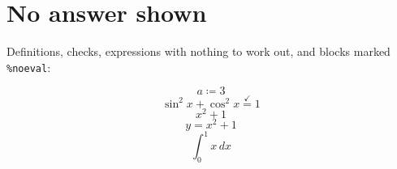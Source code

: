 \documentclass[11pt,a4paper]{article}
\theoremstyle{plain}
\theoremstyle{definition}
\theoremstyle{remark}
\begin{document}
\section*{No answer shown}

Definitions, checks, expressions with nothing to work out, and blocks marked \texttt{\%noeval}:

\begin{equation*}
  a \coloneqq  3
\end{equation*}
\begin{equation*}
  \sin^2 x + \cos^2 x \overset{\checkmark }{=} 1
\end{equation*}
\begin{equation*}
  x^2 + 1
\end{equation*}
\begin{equation*}
  y = x^2 + 1
\end{equation*}
\begin{equation*}
  \int_0^1 x \, dx
\end{equation*}
\end{document}
